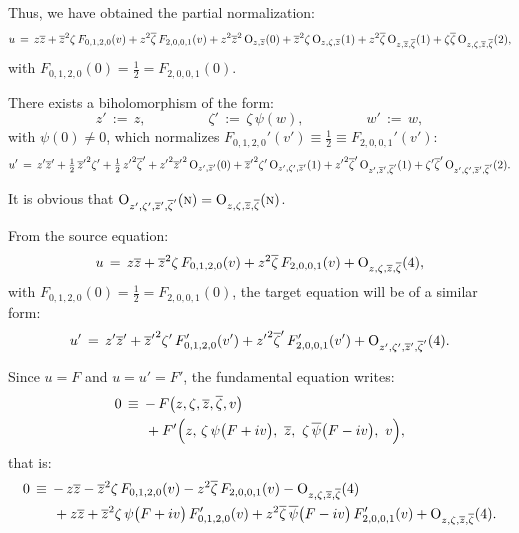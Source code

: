 \documentclass[12pt,twoside,leqno,openany]{amsart}
\begin{document}
\label{prenormalization-step-III}

Thus, we have obtained the partial normalization:
\[
\aligned
u
\,=\,
z\overline{z}
+
\overline{z}^2\zeta\,
F_{0,1,2,0}(v)
+
z^2\overline{\zeta}\,
F_{2,0,0,1}(v)
+
z^2\overline{z}^2\,
{\rm O}_{z,\overline{z}}(0)
+
\overline{z}^2\zeta\,
{\rm O}_{z,\zeta,\overline{z}}(1)
+
z^2\overline{\zeta}\,
{\rm O}_{z,\overline{z},\overline{\zeta}}(1)
+
\zeta\overline{\zeta}\,
{\rm O}_{z,\zeta,\overline{z},\overline{\zeta}}(2),
\endaligned
\]
with $F_{0,1,2,0}(0) = \frac{1}{2} = F_{2,0,0,1}(0)$.

\begin{Lemma}
There exists a biholomorphism of the form:
\[
z'
\,:=\,
z,
\ \ \ \ \ \ \ \ \ \ \ \ \ \ \ \ \ \ \ \
\zeta'
\,:=\,
\zeta\,\psi(w),
\ \ \ \ \ \ \ \ \ \ \ \ \ \ \ \ \ \ \ \
w'
\,:=\,
w,
\]
with $\psi(0) \neq 0$, which 
normalizes $F_{0,1,2,0}'(v') \equiv \frac{1}{2} \equiv
F_{2,0,0,1}'(v')$:
\[
u'
\,=\,
z'\overline{z}'
+
\tfrac{1}{2}\,
{\overline{z}'}^2\zeta'
+
\tfrac{1}{2}\,
{z'}^2\overline{\zeta}'
+
{z'}^2{\overline{z}'}^2\,
{\rm O}_{z',\overline{z}'}(0)
+
{\overline{z}'}^2\zeta'\,
{\rm O}_{z',\zeta',\overline{z}'}(1)
+
{z'}^2\overline{\zeta}'\,
{\rm O}_{z',\overline{z}',\overline{\zeta}'}(1)
+
\zeta'\overline{\zeta}'\,
{\rm O}_{z',\zeta',\overline{z}',\overline{\zeta}'}(2).
\]
\end{Lemma}

\proof
It is obvious that ${\rm O}_{z', \zeta', \overline{z}', 
\overline{\zeta}'} (\text{\sc n}) = {\rm O}_{z, \zeta, \overline{z},
\overline{\zeta}}(\text{\sc n})$. 

From the source equation:
\[
u
\,=\,
z\overline{z}
+
\overline{z}^2\zeta\,
F_{0,1,2,0}(v)
+
z^2\overline{\zeta}\,
F_{2,0,0,1}(v)
+
{\rm O}_{z,\zeta,\overline{z},\overline{\zeta}}(4),
\]
with $F_{0,1,2,0}(0) = \frac{1}{2} = F_{2,0,0,1}(0)$,
the target equation will be of a similar form:
\[
u'
\,=\,
z'\overline{z}'
+
{\overline{z}'}^2\zeta'\,
F_{0,1,2,0}'(v')
+
{z'}^2\overline{\zeta}'\,
F_{2,0,0,1}'(v')
+
{\rm O}_{z',\zeta',\overline{z}',\overline{\zeta}'}(4).
\]

Since $u = F$ and $u = u' = F'$, 
the fundamental equation writes:
\[
\aligned
0
&
\,\equiv\,
-\,F\big(z,\zeta,\overline{z},\overline{\zeta},v\big)
\\
&
\ \ \ \ \
+
F'
\Big(
z,\,\zeta\,\psi\big(F+iv\big),\,\,
\overline{z},\,\,
\zeta\,\overline{\psi}\big(F-iv\big),\,\,
v
\Big),
\endaligned
\]
that is:
\[
\aligned
0
&
\,\equiv\,
-\,z\overline{z}
-
\overline{z}^2\zeta\,
F_{0,1,2,0}(v)
-
z^2\overline{\zeta}\,
F_{2,0,0,1}(v)
-
{\rm O}_{z,\zeta,\overline{z},\overline{\zeta}}(4)
\\
&
\ \ \ \ \
+
z\overline{z}
+
\overline{z}^2\zeta\,
\psi\big(F+iv\big)\,
F_{0,1,2,0}'(v)
+
z^2\overline{\zeta}\,
\overline{\psi}\big(F-iv\big)\,
F_{2,0,0,1}'(v)
+
{\rm O}_{z,\zeta,\overline{z},\overline{\zeta}}(4).
\endaligned
\]
\end{document}
